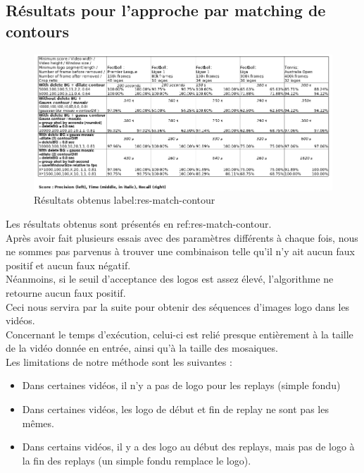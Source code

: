 \documentclass[11pt]{article}
\begin{document}
\subsection{Résultats pour l'approche par matching de contours}
\label{sec:org7869cd6}
\begin{figure}[htbp]
\centering
\includegraphics[width=17cm]{res_match_contour.png}
\caption{Résultats obtenus label:res-match-contour}
\end{figure}
Les résultats obtenus sont présentés en ref:res-match-contour.\\

Après avoir fait plusieurs essais avec des paramètres différents à chaque fois, nous ne sommes pas parvenus à trouver une combinaison telle qu'il n'y ait aucun faux positif et aucun faux négatif.\\
Néanmoins, si le seuil d'acceptance des logos est assez élevé, l'algorithme ne retourne aucun faux positif.\\
Ceci nous servira par la suite pour obtenir des séquences d'images logo dans les vidéos.\\

Concernant le temps d’exécution, celui-ci est relié presque entièrement à la taille de la vidéo donnée en entrée, ainsi qu’à la taille des mosaiques.\\

Les limitations de notre méthode sont les suivantes :\\
\begin{itemize}
\item Dans certaines vidéos, il n’y a pas de logo pour les replays (simple fondu)\\
\item Dans certaines vidéos, les logo de début et fin de replay ne sont pas les mêmes.\\
\item Dans certains vidéos, il y a des logo au début des replays, mais pas de logo à la fin des replays (un simple fondu remplace le logo).\\
\end{itemize}
\end{document}
